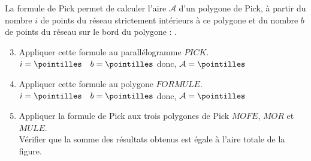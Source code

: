 \begin{enigme}
      La formule de Pick permet de calculer l'aire $\mathcal{A}$ d'un polygone de Pick, à partir du nombre $i$ de points du réseau strictement intérieurs à ce polygone et du nombre $b$ de points du réseau sur le bord du polygone : . 
      \begin{enumerate}
      \setcounter{enumi}{2}
         \item Appliquer cette formule au parallélogramme $PICK$. \\ [3mm]
            $i =\pointilles  \quad b =\pointilles $ \quad donc, $\mathcal{A} = \pointilles $ \\
          \item Appliquer cette formule au polygone $FORMULE$. \\ [3mm]
            $i =\pointilles  \quad b =\pointilles $ \quad donc, $\mathcal{A} = \pointilles $ \\
          \item Appliquer la formule de Pick aux trois polygones de Pick $MOFE$, $MOR$ et $MULE$. \\
            Vérifier que la somme des résultats obtenus est égale à l'aire totale de la figure. \par \bigskip
            \pointilles \par \bigskip
            \pointilles \par \bigskip
            \pointilles 
      \end{enumerate}
\end{enigme}

